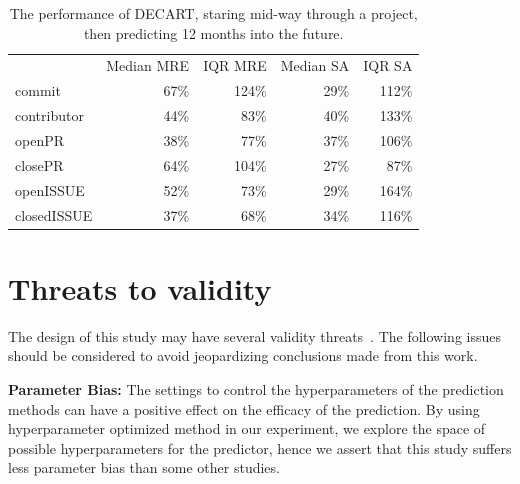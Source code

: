 \documentclass[smallextended]{svjour3}
\begin{document}
\begin{table}[!b]
\centering

\begin{adjustbox}{max width=0.98\textwidth}
\begin{tabular}{lrrrr}
            & \multicolumn{1}{c}{Median MRE} & \multicolumn{1}{c}{IQR MRE}   & \multicolumn{1}{c}{Median SA} & \multicolumn{1}{c}{IQR SA}    \\
commit      & \cellcolor[HTML]{F3F3F3}67\%   & \cellcolor[HTML]{F3F3F3}124\% & \cellcolor[HTML]{F3F3F3}29\%  & \cellcolor[HTML]{F3F3F3}112\% \\
contributor & \cellcolor[HTML]{FFFFFF}44\%   & \cellcolor[HTML]{FFFFFF}83\%  & \cellcolor[HTML]{FFFFFF}40\%  & \cellcolor[HTML]{FFFFFF}133\% \\
openPR      & \cellcolor[HTML]{F3F3F3}38\%   & \cellcolor[HTML]{F3F3F3}77\%  & \cellcolor[HTML]{F3F3F3}37\%  & \cellcolor[HTML]{F3F3F3}106\% \\
closePR     & \cellcolor[HTML]{FFFFFF}64\%   & \cellcolor[HTML]{FFFFFF}104\% & \cellcolor[HTML]{FFFFFF}27\%  & \cellcolor[HTML]{FFFFFF}87\%  \\
openISSUE   & \cellcolor[HTML]{F3F3F3}52\%   & \cellcolor[HTML]{F3F3F3}73\%  & \cellcolor[HTML]{F3F3F3}29\%  & \cellcolor[HTML]{F3F3F3}164\% \\
closedISSUE & \cellcolor[HTML]{FFFFFF}37\%   & \cellcolor[HTML]{FFFFFF}68\%  & \cellcolor[HTML]{FFFFFF}34\%  & \cellcolor[HTML]{FFFFFF}116\%
\end{tabular}
\end{adjustbox}
\caption{The performance of DECART, staring mid-way through a project, then predicting 12 months into the future.}
\label{tbl:mid}
\end{table}


\section{Threats to validity}
\label{sect:threa}
The design of this study may have several validity threats~\cite{feldt2010validity}. The following issues should be considered to avoid jeopardizing conclusions made from this work.
 

\textbf{Parameter Bias:} The settings to control the hyperparameters of the prediction methods can have a positive effect on the efficacy of the prediction. By using hyperparameter optimized method in our experiment, we explore the space of possible hyperparameters for the predictor, hence we assert that this study suffers less parameter bias than some other studies.
\end{document}
